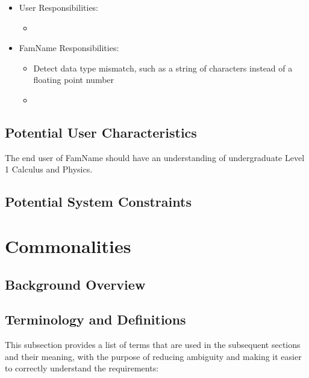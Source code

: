 \documentclass[12pt]{article}
\newcommand{\famname}{FamName} %
\begin{document}

\begin{itemize}
\item User Responsibilities:
\begin{itemize}
\item 
\end{itemize}
\item \famname{} Responsibilities:
\begin{itemize}
\item Detect data type mismatch, such as a string of characters instead of a
  floating point number
\item 
\end{itemize}
\end{itemize}

\subsection{Potential User Characteristics} \label{SecUserCharacteristics}

The end user of \famname{} should have an understanding of undergraduate Level
1 Calculus and Physics.

\subsection{Potential System Constraints}


\section{Commonalities}

\subsection{Background Overview} \label{Sec_Background}

\subsection{Terminology and  Definitions}

This subsection provides a list of terms that are used in the subsequent
sections and their meaning, with the purpose of reducing ambiguity and making it
easier to correctly understand the requirements:
\end{document}

